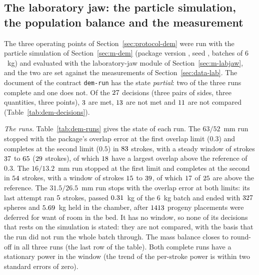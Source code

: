 \subsection{The laboratory jaw: the particle simulation, the population balance and the measurement}\label{sec:results-dem}

The three operating points of Section~\ref{sec:protocol-dem} were run with the particle simulation of Section~\ref{sec:m-dem} (package version \demPackageVersion, seed \demSeed, batches of $6$~kg) and evaluated with the laboratory-jaw module of Section~\ref{sec:m-labjaw}, and the two are set against the measurements of Section~\ref{sec:data-lab}. The document of the contract \texttt{dem-run} has the state \emph{partial}: two of the three runs complete and one does not. Of the $27$ decisions (three pairs of sides, three quantities, three points), $3$ are met, $13$ are not met and $11$ are not compared (Table~\ref{tab:dem-decisions}).

\emph{The runs.} Table~\ref{tab:dem-runs} gives the state of each run. The $63/52$~mm run stopped with the package's overlap error at the first overlap limit ($0.3$) and completes at the second limit ($0.5$) in $83$ strokes, with a steady window of strokes $37$ to $65$ ($29$ strokes), of which $18$ have a largest overlap above the reference of $0.3$. The $16/13.2$~mm run stopped at the first limit and completes at the second in $54$ strokes, with a window of strokes $15$ to $39$, of which $17$ of $25$ are above the reference. The $31.5/26.5$~mm run stops with the overlap error at both limits: its last attempt ran $5$ strokes, passed $0.31$~kg of the $6$~kg batch and ended with $327$ spheres and $5.69$~kg held in the chamber, after $1413$ progeny placements were deferred for want of room in the bed. It has no window, so none of its decisions that rests on the simulation is stated: they are not compared, with the basis that the run did not run the whole batch through. The mass balance closes to round-off in all three runs (the last row of the table). Both complete runs have a stationary power in the window (the trend of the per-stroke power is within two standard errors of zero).

\begin{table}[!t]
\centering
\caption{The three runs of the particle simulation as the committed document records them: the attempts of the overlap ladder (limit, end, strokes), the final attempt's strokes and steps, the window, the whole-run values beside the window's, the breakage summary and the mass balance. The $31.5/26.5$~mm run ends with the overlap error at both limits and has no window. Generated from \texttt{jaw-lab.json}.}
\label{tab:dem-runs}
\scriptsize

\end{table}

